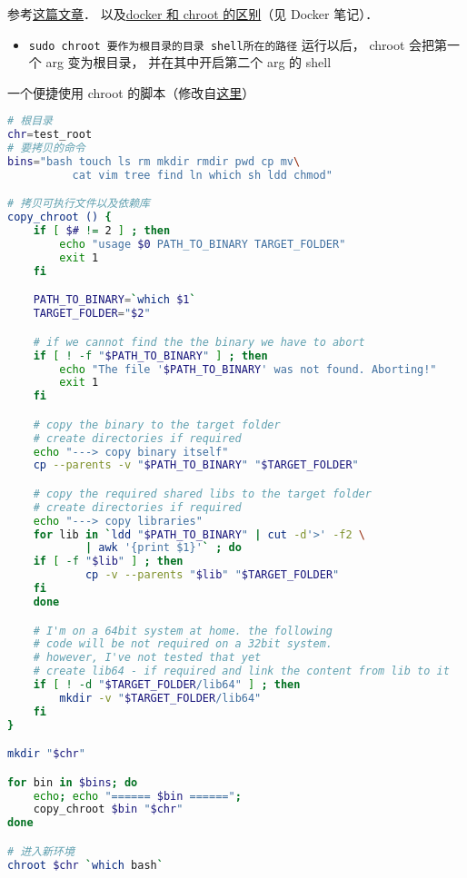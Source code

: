
\begin{issues}
\issueDraft
\end{issues}

参考\href{https://www.howtogeek.com/441534/how-to-use-the-chroot-command-on-linux/}{这篇文章}．
以及\href{https://devops.stackexchange.com/questions/2826/difference-between-chroot-and-docker}{docker 和 chroot 的区别}（见 Docker 笔记）．

\begin{itemize}
\item \verb|sudo chroot 要作为根目录的目录 shell所在的路径| 运行以后， chroot 会把第一个 arg 变为根目录， 并在其中开启第二个 arg 的 shell
\end{itemize}

一个便捷使用 chroot 的脚本（修改自\href{https://gist.github.com/xmonader/5d1fc6134f1f65acd0d10f71453adb27}{这里}）

\begin{lstlisting}[language=bash]
# 根目录
chr=test_root
# 要拷贝的命令
bins="bash touch ls rm mkdir rmdir pwd cp mv\
          cat vim tree find ln which sh ldd chmod"

# 拷贝可执行文件以及依赖库
copy_chroot () {
	if [ $# != 2 ] ; then
		echo "usage $0 PATH_TO_BINARY TARGET_FOLDER"
		exit 1
	fi

	PATH_TO_BINARY=`which $1`
	TARGET_FOLDER="$2"

	# if we cannot find the the binary we have to abort
	if [ ! -f "$PATH_TO_BINARY" ] ; then
		echo "The file '$PATH_TO_BINARY' was not found. Aborting!"
		exit 1
	fi

	# copy the binary to the target folder
	# create directories if required
	echo "---> copy binary itself"
	cp --parents -v "$PATH_TO_BINARY" "$TARGET_FOLDER"

	# copy the required shared libs to the target folder
	# create directories if required
	echo "---> copy libraries"
	for lib in `ldd "$PATH_TO_BINARY" | cut -d'>' -f2 \
            | awk '{print $1}'` ; do
	if [ -f "$lib" ] ; then
			cp -v --parents "$lib" "$TARGET_FOLDER"
	fi  
	done

	# I'm on a 64bit system at home. the following
    # code will be not required on a 32bit system.
	# however, I've not tested that yet
	# create lib64 - if required and link the content from lib to it
	if [ ! -d "$TARGET_FOLDER/lib64" ] ; then
		mkdir -v "$TARGET_FOLDER/lib64"
	fi
}

mkdir "$chr"

for bin in $bins; do
	echo; echo "====== $bin ======";
	copy_chroot $bin "$chr"
done

# 进入新环境
chroot $chr `which bash`
\end{lstlisting}
